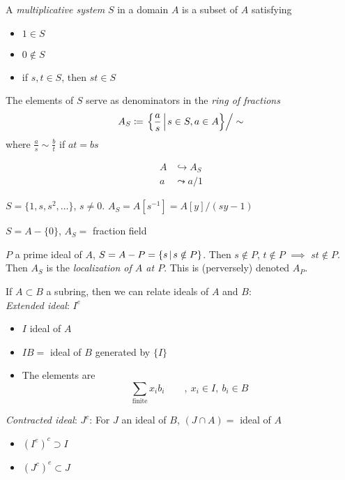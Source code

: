 \documentclass [letterpaper,11pt,twoside]{article}
\begin{document}
    \begin{defn*}
      A \emph{multiplicative system} $S$ in a domain $A$ is a subset of $A$ satisfying
      \begin{itemize}
        \item $1 \in S$
        \item $0 \notin S$
        \item if $s, t\in S$, then $st \in S$
      \end{itemize}
    \end{defn*}
    \begin{defn*}
      The elements of $S$ serve as denominators in the \emph{ring of fractions}
      $$A_S \defeq \left.\mathset[ \frac{a}{s} ]{s\in S, a\in A}\right/\sim$$
      where $\frac{a}{s} \sim \frac{b}{t}$ if $at = bs$
    \end{defn*}
    \begin{align*}
      A & \hookrightarrow A_S \\
      a & \leadsto a / 1
    \end{align*}
    \begin{example*}
      $S = \{1, s, s^2, \ldots\}$, $s \ne 0$.  $A_S = A[s^{-1}] = A[y] / (sy - 1)$
    \end{example*}
    \begin{example*}
      $S = A - \{0\}$, $A_S = $ fraction field
    \end{example*}
    \begin{example*}
      $P$ a prime ideal of $A$, $S = A - P = \mathset[s]{s\notin P}$.  Then $s\notin P$, $t\notin P$ $\implies$ $st\notin P$.  Then $A_S$ is the \emph{localization of $A$ at $P$}.  This is (perversely) denoted $A_P$.
    \end{example*}

    If $A \subset B$ a subring, then we can relate ideals of $A$ and $B$: \\
    \emph{Extended ideal}: $I^e$
    \begin{itemize}
      \item[] $I$ ideal of $A$
      \item[] $IB = $ ideal of $B$ generated by $\{I\}$
      \item[] The elements are $$\sum_{\text{finite}} x_i b_i\qquad,\ x_i\in I,\ b_i\in B$$
    \end{itemize}
    \emph{Contracted ideal}: $J^c$: For $J$ an ideal of $B$, $(J \cap A) = $ ideal of $A$

    \begin{itemize}
      \item[] $(I^e)^c \supset I$
      \item[] $(J^c)^e \subset J$
    \end{itemize}
\end{document}
